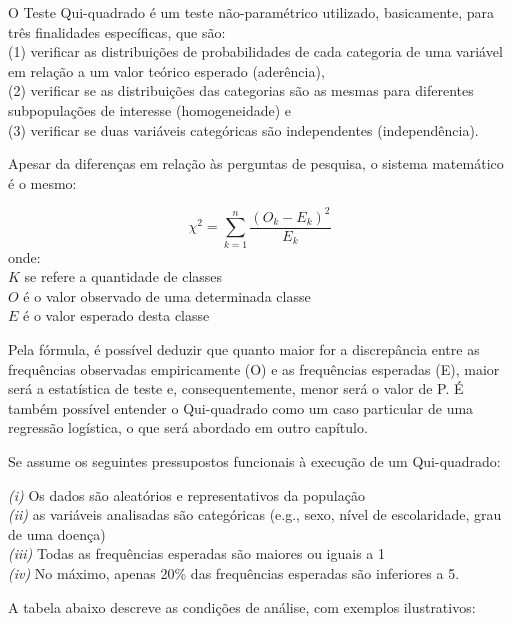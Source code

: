 \documentclass[
]{book}
\begin{document}
O Teste Qui-quadrado é um teste não-paramétrico utilizado, basicamente, para três finalidades específicas, que são:\\
(1) verificar as distribuições de probabilidades de cada categoria de uma variável em relação a um valor teórico esperado (aderência),\\
(2) verificar se as distribuições das categorias são as mesmas para diferentes subpopulações de interesse (homogeneidade) e\\
(3) verificar se duas variáveis categóricas são independentes (independência).

Apesar da diferenças em relação às perguntas de pesquisa, o sistema matemático é o mesmo:

\[\chi^2=\sum_{k=1}^{n} \frac{(O_k - E_k)^2}{E_k}\]
onde:\\
\(K\) se refere a quantidade de classes\\
\(O\) é o valor observado de uma determinada classe\\
\(E\) é o valor esperado desta classe

Pela fórmula, é possível deduzir que quanto maior for a discrepância entre as frequências observadas empiricamente (O) e as frequências esperadas (E), maior será a estatística de teste e, consequentemente, menor será o valor de P. É também possível entender o Qui-quadrado como um caso particular de uma regressão logística, o que será abordado em outro capítulo.

Se assume os seguintes pressupostos funcionais à execução de um Qui-quadrado:

\emph{(i)} Os dados são aleatórios e representativos da população\\
\emph{(ii)} as variáveis analisadas são categóricas (e.g., sexo, nível de escolaridade, grau de uma doença)\\
\emph{(iii)} Todas as frequências esperadas são maiores ou iguais a 1\\
\emph{(iv)} No máximo, apenas 20\% das frequências esperadas são inferiores a 5.

A tabela abaixo descreve as condições de análise, com exemplos ilustrativos:
\end{document}
